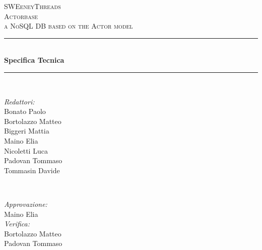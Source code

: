 \documentclass[a4paper]{article}
\begin{document}
	
	\begin{titlepage}
		\newcommand{\HRule}{\rule{\linewidth}{0.5mm}} 
		\center  
		
		\textsc{\LARGE SWEeneyThreads}\\[1.5cm] 
		\textsc{\Large Actorbase}\\[0.5cm] 
		\textsc{\large a NoSQL DB based on the Actor model}\\[0.5cm]
		
		
		\HRule \\[0.4cm]
		{ \huge \bfseries Specifica Tecnica}\\[0.4cm] 
		\HRule \\[1.5cm]
		
		\begin{minipage}{0.4\textwidth}
			\begin{flushleft} \large
				\emph{Redattori:}\\
				Bonato Paolo \\
				Bortolazzo Matteo \\
				Biggeri Mattia \\
				Maino Elia \\
				Nicoletti Luca  \\
				Padovan Tommaso \\
				Tommasin Davide
			\end{flushleft}
		\end{minipage}
		~
		\begin{minipage}{0.4\textwidth}
			\begin{flushright} \large
				\emph{Approvazione:} \\
                    Maino Elia \\
				\emph{Verifica:} \\
                    Bortolazzo Matteo\\
                    Padovan Tommaso \\
				 
			\end{flushright}
		\end{minipage}
		

\end{titlepage}
\end{document}
